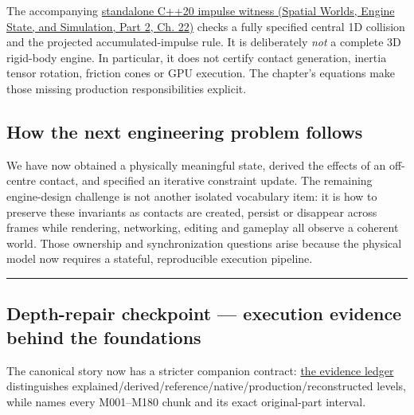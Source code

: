 The accompanying \href{../05-Spatial-Worlds-Engine-State-and-Simulation-P02/main.pdf\#nameddest=source-file-128143bcbfc7213e97eaefa4}{standalone C++20 impulse witness (Spatial Worlds, Engine State, and Simulation, Part 2, Ch. 22)} checks a fully specified central 1D collision and the projected accumulated-impulse rule. It is deliberately \emph{not} a complete 3D rigid-body engine. In particular, it does not certify contact generation, inertia tensor rotation, friction cones or GPU execution. The chapter's equations make those missing production responsibilities explicit.

\subsection{How the next engineering problem follows}\label{02-foundations-ii-ch039-how-the-next-engineering-problem-follows}

\hypertarget{02-foundations-ii-ch039-how-the-next-engineering-problem-follows}{}

We have now obtained a physically meaningful state, derived the effects of an off-centre contact, and specified an iterative constraint update. The remaining engine-design challenge is not another isolated vocabulary item: it is how to preserve these invariants as contacts are created, persist or disappear across frames while rendering, networking, editing and gameplay all observe a coherent world. Those ownership and synchronization questions arise because the physical model now requires a stateful, reproducible execution pipeline.

\begin{center}\rule{0.5\linewidth}{0.5pt}\end{center}

\subsection{Depth-repair checkpoint --- execution evidence behind the foundations}\label{02-foundations-ii-ch039-depth-repair-checkpoint-execution-evidence-behind-the-foundations}

\hypertarget{02-foundations-ii-ch039-depth-repair-checkpoint-execution-evidence-behind-the-foundations}{}

The canonical story now has a stricter companion contract: \hyperref[appendix-2358b21a702d]{the evidence ledger} distinguishes explained/derived/reference/native/production/reconstructed levels, while  names every M001--M180 chunk and its exact original-part interval.

